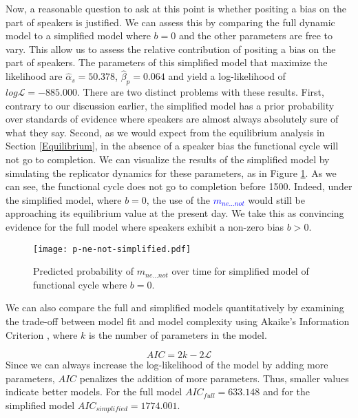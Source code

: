 \documentclass[linguex]{sp}
\theoremstyle{definition} \newtheorem{definition}{Definition}
\begin{document}
Now, a reasonable question to ask at this point is whether positing a bias on the part of speakers is justified. We can assess this by comparing the full dynamic model to a simplified model where $b=0$ and the other parameters are free to vary. This allow us to assess the relative contribution of positing a bias on the part of speakers.  The parameters of this simplified model that maximize the likelihood are $\hat{\alpha}_{s} = 50.378$, $\hat{\beta}_p =   0.064$ and yield a log-likelihood of $log\mathcal{L} = -885.000$. There are two distinct problems with these results. First, contrary to our discussion earlier, the simplified model has a prior probability over standards of evidence where speakers are almost always absolutely sure of what they say. Second, as we would expect from the equilibrium analysis in Section \ref{Equilibrium}, in the absence of a speaker bias  the functional cycle will not go to completion. We can visualize the results of the simplified model by simulating the replicator dynamics for these parameters, as in Figure \ref{m2-sol-simplified}. As we can see, the functional cycle does not go to completion before 1500. Indeed, under the simplified model, where $b=0$, the use of the \textcolor{blue}{$m_{ne...not}$} would still be approaching its equilibrium value at the present day. We take this as convincing evidence for the full model where speakers exhibit a non-zero bias $b > 0$.

\begin{figure}
\centering
     \texttt{[image: p-ne-not-simplified.pdf]}
\caption{Predicted probability of \textit{\color{blue} $m_{ne...not}$} over time for simplified model of functional cycle where $b=0$.}
\label{m2-sol-simplified}
\end{figure}

We can also compare the full and simplified models quantitatively by examining the trade-off between model fit and model complexity using Akaike's Information Criterion \citep{akaike1974}, where $k$ is the number of parameters  in the model. 
 
\begin{equation}
	AIC = 2k - 2\mathcal{L}
\end{equation}
Since we can always increase the log-likelihood of the model by adding more parameters, $AIC$ penalizes the addition of more parameters. Thus, smaller values indicate better models.  For the full model  $AIC_{full} = 633.148$ and for the simplified model $AIC_{simplified} = 1774.001$. 
\end{document}
